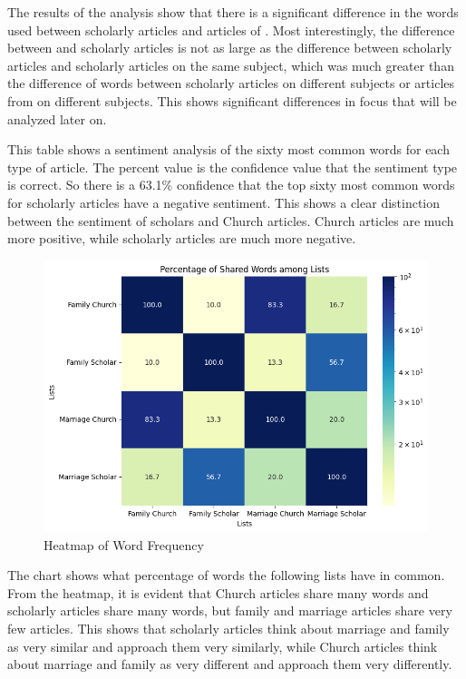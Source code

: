\documentclass[twocolumn]{article}
\begin{document}
The results of the analysis show that there is a significant difference in the words used between scholarly articles and articles of \church. Most interestingly, the difference between \church and scholarly articles is not as large as the difference between scholarly articles and scholarly articles on the same subject, which was much greater than the difference of words between scholarly articles on different subjects or articles from \church on different subjects. This shows significant differences in focus that will be analyzed later on.


This table shows a sentiment analysis of the sixty most common words for each type of article. The percent value is the confidence value that the sentiment type is correct. So there is a 63.1\% confidence that the top sixty most common words for scholarly articles have a negative sentiment. This shows a clear distinction between the sentiment of scholars and Church articles. Church articles are much more positive, while scholarly articles are much more negative.
\begin{figure}[h]
    \centering
    \includegraphics[width=\linewidth]{../heatmap.png}
    \caption{Heatmap of Word Frequency}
    \label{fig:heatmap}
\end{figure}

The chart shows what percentage of words the following lists have in common. From the heatmap, it is evident that Church articles share many words and scholarly articles share many words, but family and marriage articles share very few articles. This shows that scholarly articles think about marriage and family as very similar and approach them very similarly, while Church articles think about marriage and family as very different and approach them very differently.
\end{document}
